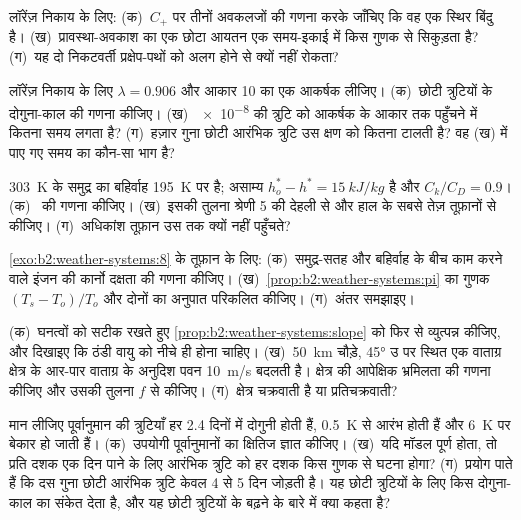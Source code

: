 \begin{exercise}[$\star\star$]\label{exo:b2:weather-systems:6}
लॉरेंज़ निकाय के लिए: (क)~$C_+$ पर तीनों अवकलजों की गणना करके जाँचिए कि वह एक स्थिर बिंदु है।
(ख)~प्रावस्था-अवकाश का एक छोटा आयतन एक समय-इकाई में किस गुणक से सिकुड़ता है? (ग)~यह दो निकटवर्ती
प्रक्षेप-पथों को अलग होने से क्यों नहीं रोकता?
\end{exercise}

\begin{exercise}[$\star\star$]\label{exo:b2:weather-systems:7}
लॉरेंज़ निकाय के लिए $\lambda = 0.906$ और आकार 10 का एक आकर्षक लीजिए। (क)~छोटी त्रुटियों के
दोगुना-काल की गणना कीजिए। (ख)~\num{e-8} की त्रुटि को आकर्षक के आकार तक पहुँचने में कितना समय लगता है?
(ग)~हज़ार गुना छोटी आरंभिक त्रुटि उस क्षण को कितना टालती है? वह (ख) में पाए गए समय का
कौन-सा भाग है?
\end{exercise}

\begin{exercise}[$\star\star$]\label{exo:b2:weather-systems:8}
\qty{303}{K} के समुद्र का बहिर्वाह \qty{195}{K} पर है; असाम्य $h_o^* - h^* =
\qty{15}{kJ/kg}$ है और $C_k/C_D = 0.9$। (क)~ की गणना कीजिए। (ख)~इसकी तुलना
श्रेणी 5 की देहली से और हाल के सबसे तेज़ तूफ़ानों से कीजिए। (ग)~अधिकांश तूफ़ान उस तक
क्यों नहीं पहुँचते?
\end{exercise}

\begin{exercise}[$\star\star$]\label{exo:b2:weather-systems:9}
\cref{exo:b2:weather-systems:8} के तूफ़ान के लिए: (क)~समुद्र-सतह और बहिर्वाह के बीच काम करने वाले
इंजन की कार्नो दक्षता की गणना कीजिए। (ख)~\cref{prop:b2:weather-systems:pi} का गुणक $(T_s - T_o)/T_o$
और दोनों का अनुपात परिकलित कीजिए। (ग)~अंतर समझाइए।
\end{exercise}

\begin{exercise}[$\star\star\star$]\label{exo:b2:weather-systems:10}
(क)~घनत्वों को सटीक रखते हुए \cref{prop:b2:weather-systems:slope} को फिर से व्युत्पन्न कीजिए, और दिखाइए कि
ठंडी वायु को नीचे ही होना चाहिए। (ख)~\qty{50}{km} चौड़े, \ang{45} उ पर स्थित एक वाताग्र क्षेत्र के आर-पार
वाताग्र के अनुदिश पवन \qty{10}{m/s} बदलती है। क्षेत्र की आपेक्षिक भ्रमिलता की गणना कीजिए और उसकी तुलना
$f$ से कीजिए। (ग)~क्षेत्र चक्रवाती है या प्रतिचक्रवाती?
\end{exercise}

\begin{exercise}[$\star\star\star$]\label{exo:b2:weather-systems:11}
मान लीजिए पूर्वानुमान की त्रुटियाँ हर 2.4 दिनों में दोगुनी होती हैं, \qty{0.5}{K} से आरंभ होती हैं और
\qty{6}{K} पर बेकार हो जाती हैं। (क)~उपयोगी पूर्वानुमानों का क्षितिज ज्ञात कीजिए। (ख)~यदि मॉडल पूर्ण होता, तो प्रति
दशक एक दिन पाने के लिए आरंभिक त्रुटि को हर दशक किस गुणक से घटना होगा? (ग)~प्रयोग पाते हैं कि
दस गुना छोटी आरंभिक त्रुटि केवल 4 से 5 दिन जोड़ती है। यह छोटी त्रुटियों के लिए किस दोगुना-काल का संकेत देता है,
और यह छोटी त्रुटियों के बढ़ने के बारे में क्या कहता है?
\end{exercise}

